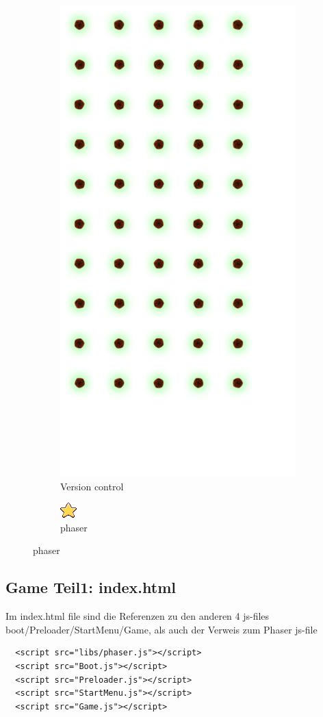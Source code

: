 \documentclass{article}
\begin{document}
\begin{figure}[ht]
\centering
\begin{subfigure}{.5\textwidth}
  \centering
  \includegraphics[width=.3\linewidth]{spacerock}
  \caption{Version control}
  \label{fig:sub1}
\end{subfigure}%
\begin{subfigure}{.5\textwidth}
  \centering
  \includegraphics[width=.3\linewidth]{star}
  \caption{phaser}
  \label{fig:sub2}
\end{subfigure}
\end{figure}








\cleardoublepage







\subsection{Game Teil1: index.html}

Im index.html file sind die Referenzen zu den anderen 4
js-files boot/Preloader/StartMenu/Game, als auch der Verweis zum Phaser js-file

\begin{lstlisting}
  <script src="libs/phaser.js"></script>
  <script src="Boot.js"></script>
  <script src="Preloader.js"></script>
  <script src="StartMenu.js"></script>
  <script src="Game.js"></script>
\end{lstlisting}
\end{document}
